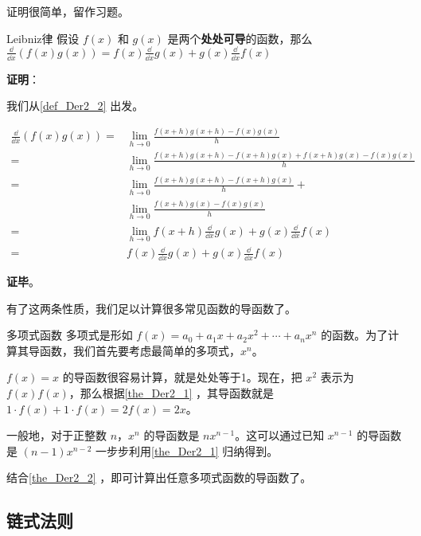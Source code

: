 证明很简单，留作习题。

\begin{theorem}{Leibniz律}\label{the_Der2_1}
假设 $f(x)$ 和 $g(x)$ 是两个\textbf{处处可导}的函数，那么 $\frac{\dd}{\dd x}(f(x)g(x))=f(x)\frac{\dd}{\dd x}g(x)+g(x)\frac{\dd}{\dd x}f(x)$
\end{theorem}

\textbf{证明}：

我们从\autoref{def_Der2_2} 出发。

\begin{equation}
\begin{aligned}
\frac{\dd}{\dd x}(f(x)g(x))=&\lim\limits_{h\to 0}\frac{f(x+h)g(x+h)-f(x)g(x)}{h}\\
=&\lim\limits_{h\to 0}\frac{f(x+h)g(x+h)-f(x+h)g(x)+f(x+h)g(x)-f(x)g(x)}{h}\\
=&\lim\limits_{h\to 0}\frac{f(x+h)g(x+h)-f(x+h)g(x)}{h}+\\&\lim\limits_{h\to 0}\frac{f(x+h)g(x)-f(x)g(x)}{h}\\
=&\lim\limits_{h\to 0}f(x+h)\frac{\dd}{\dd x}g(x)+g(x)\frac{\dd}{\dd x}f(x)\\
=&f(x)\frac{\dd}{\dd x}g(x)+g(x)\frac{\dd}{\dd x}f(x)
\end{aligned}
\end{equation}

\textbf{证毕}。

有了这两条性质，我们足以计算很多常见函数的导函数了。

\begin{example}{多项式函数}
多项式是形如 $f(x)=a_0+a_1x+a_2x^2+\cdots+a_nx^n$ 的函数。为了计算其导函数，我们首先要考虑最简单的多项式，$x^n$。

$f(x)=x$ 的导函数很容易计算，就是处处等于1。现在，把 $x^2$ 表示为 $f(x)f(x)$，那么根据\autoref{the_Der2_1} ，其导函数就是 $1\cdot f(x)+1\cdot f(x)=2f(x)=2x$。

一般地，对于正整数 $n$，$x^n$ 的导函数是 $nx^{n-1}$。这可以通过已知 $x^{n-1}$ 的导函数是 $(n-1)x^{n-2}$ 一步步利用\autoref{the_Der2_1} 归纳得到。

结合\autoref{the_Der2_2} ，即可计算出任意多项式函数的导函数了。
\end{example}


\subsection{链式法则}













